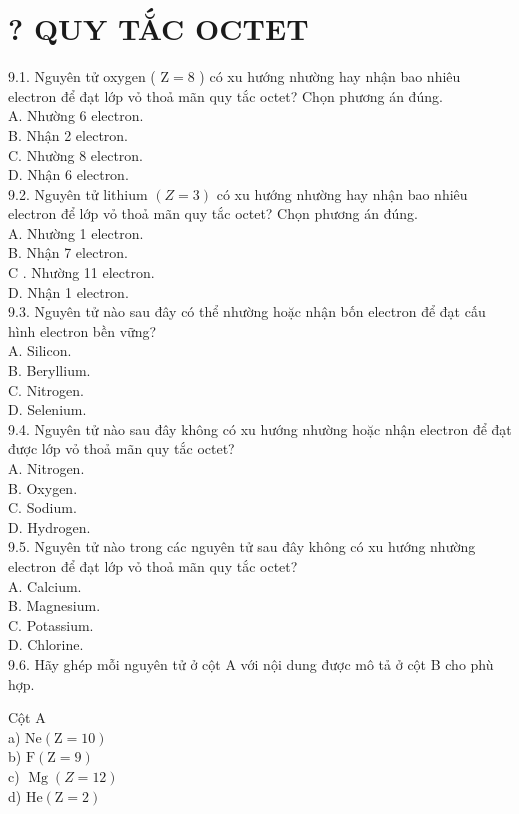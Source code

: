 \documentclass[10pt]{article}
\begin{document}
\section*{? QUY TẮC OCTET}
9.1. Nguyên tử oxygen ( $\mathrm{Z}=8$ ) có xu hướng nhường hay nhận bao nhiêu electron để đạt lớp vỏ thoả mãn quy tắc octet? Chọn phương án đúng.\\
A. Nhường 6 electron.\\
B. Nhận 2 electron.\\
C. Nhường 8 electron.\\
D. Nhận 6 electron.\\
9.2. Nguyên tử lithium $(Z=3)$ có xu hướng nhường hay nhận bao nhiêu electron để lớp vỏ thoả mãn quy tắc octet? Chọn phương án đúng.\\
A. Nhường 1 electron.\\
B. Nhận 7 electron.\\
C . Nhường 11 electron.\\
D. Nhận 1 electron.\\
9.3. Nguyên tử nào sau đây có thể nhường hoặc nhận bốn electron để đạt cấu hình electron bền vững?\\
A. Silicon.\\
B. Beryllium.\\
C. Nitrogen.\\
D. Selenium.\\
9.4. Nguyên tử nào sau đây không có xu hướng nhường hoặc nhận electron để đạt được lớp vỏ thoả mãn quy tắc octet?\\
A. Nitrogen.\\
B. Oxygen.\\
C. Sodium.\\
D. Hydrogen.\\
9.5. Nguyên tử nào trong các nguyên tử sau đây không có xu hướng nhường electron để đạt lớp vỏ thoả mãn quy tắc octet?\\
A. Calcium.\\
B. Magnesium.\\
C. Potassium.\\
D. Chlorine.\\
9.6. Hãy ghép mỗi nguyên tử ở cột A với nội dung được mô tả ở cột B cho phù hợp.

Cột A\\
a) $\mathrm{Ne}(\mathrm{Z}=10)$\\
b) $\mathrm{F}(\mathrm{Z}=9)$\\
c) $\operatorname{Mg}(Z=12)$\\
d) $\mathrm{He}(\mathrm{Z}=2)$
\end{document}
